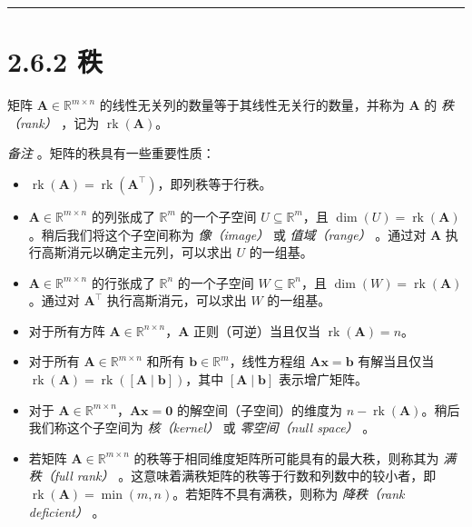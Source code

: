 \medskip\hrule\medskip

\section*{2.6.2 秩}

矩阵 $ \boldsymbol{A} \in \mathbb{R}^{m \times n} $ 的线性无关列的数量等于其线性无关行的数量，并称为 $ \boldsymbol{A} $ 的 \emph{秩（rank）} ，记为 $ \operatorname{rk}(\boldsymbol{A}) $。

\emph{备注} 。矩阵的秩具有一些重要性质：

\begin{itemize}
\item $ \operatorname{rk}(\boldsymbol{A}) = \operatorname{rk}(\boldsymbol{A}^\top) $，即列秩等于行秩。
\item $ \boldsymbol{A} \in \mathbb{R}^{m \times n} $ 的列张成了 $ \mathbb{R}^m $ 的一个子空间 $ U \subseteq \mathbb{R}^m $，且 $ \operatorname{dim}(U) = \operatorname{rk}(\boldsymbol{A}) $。稍后我们将这个子空间称为 \emph{像（image）} 或 \emph{值域（range）} 。通过对 $ \boldsymbol{A} $ 执行高斯消元以确定主元列，可以求出 $ U $ 的一组基。
\item $ \boldsymbol{A} \in \mathbb{R}^{m \times n} $ 的行张成了 $ \mathbb{R}^n $ 的一个子空间 $ W \subseteq \mathbb{R}^n $，且 $ \operatorname{dim}(W) = \operatorname{rk}(\boldsymbol{A}) $。通过对 $ \boldsymbol{A}^\top $ 执行高斯消元，可以求出 $ W $ 的一组基。
\item 对于所有方阵 $ \boldsymbol{A} \in \mathbb{R}^{n \times n} $，$ \boldsymbol{A} $ 正则（可逆）当且仅当 $ \operatorname{rk}(\boldsymbol{A}) = n $。
\item 对于所有 $ \boldsymbol{A} \in \mathbb{R}^{m \times n} $ 和所有 $ \boldsymbol{b} \in \mathbb{R}^m $，线性方程组 $ \boldsymbol {Ax} = \boldsymbol{b} $ 有解当且仅当 $ \operatorname{rk}(\boldsymbol{A}) = \operatorname{rk}([\boldsymbol{A} \mid \boldsymbol{b}]) $，其中 $ [\boldsymbol{A} \mid \boldsymbol{b}] $ 表示增广矩阵。
\item 对于 $ \boldsymbol{A} \in \mathbb{R}^{m \times n} $，$ \boldsymbol {Ax} = \boldsymbol{0} $ 的解空间（子空间）的维度为 $ n - \operatorname{rk}(\boldsymbol{A}) $。稍后我们称这个子空间为 \emph{核（kernel）} 或 \emph{零空间（null space）} 。
\item 若矩阵 $ \boldsymbol{A} \in \mathbb{R}^{m \times n} $ 的秩等于相同维度矩阵所可能具有的最大秩，则称其为 \emph{满秩（full rank）} 。这意味着满秩矩阵的秩等于行数和列数中的较小者，即 $ \operatorname{rk}(\boldsymbol{A}) = \min(m, n) $。若矩阵不具有满秩，则称为 \emph{降秩（rank deficient）} 。
\end{itemize}

